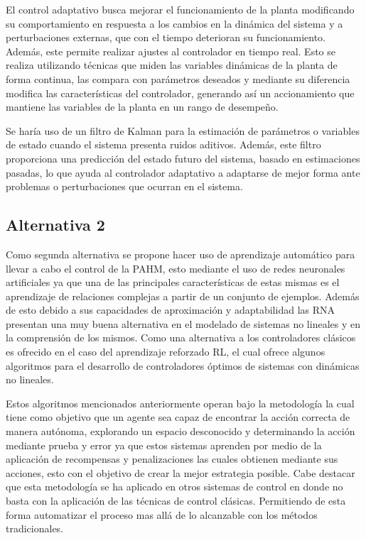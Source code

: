 \documentclass[12pt]{article}
\begin{document}
El control adaptativo busca mejorar el funcionamiento de la planta modificando su comportamiento en respuesta a los cambios en la dinámica del sistema y a perturbaciones externas, que con el tiempo deterioran su funcionamiento. Además, este permite realizar ajustes al controlador en tiempo real. Esto se realiza utilizando técnicas que miden las variables dinámicas de la planta de forma continua, las compara con parámetros deseados y mediante su diferencia modifica las características del controlador, generando así un accionamiento que mantiene las variables de la planta en un rango de desempeño\cite{15-tec}.

Se haría uso de un filtro de Kalman para la estimación de parámetros o variables de estado cuando el sistema presenta ruidos aditivos. Además, este filtro proporciona una predicción del estado futuro del sistema, basado en estimaciones pasadas, lo que ayuda al controlador adaptativo a adaptarse de mejor forma ante problemas o perturbaciones que ocurran en el sistema\cite{15-tec}.

\subsection{Alternativa 2}

Como segunda alternativa se propone hacer uso de aprendizaje automático para llevar a cabo el control de la PAHM, esto mediante el uso de redes neuronales artificiales ya que una de las principales características de estas mismas es el aprendizaje de relaciones complejas a partir de un conjunto de ejemplos. Además de esto debido a sus capacidades de aproximación y adaptabilidad las RNA presentan una muy buena alternativa en el modelado de sistemas no lineales y en la comprensión de los mismos. Como una alternativa a los controladores clásicos es ofrecido en el caso del aprendizaje reforzado RL, el cual ofrece algunos algoritmos para el desarrollo de controladores óptimos de sistemas con dinámicas no lineales\cite{15-tec}. 

Estos algoritmos mencionados anteriormente operan bajo la metodología la cual tiene como objetivo que un agente sea capaz de encontrar la acción correcta de manera autónoma, explorando un espacio desconocido y determinando la acción mediante prueba y error ya que estos sistemas aprenden por medio de la aplicación de recompensas y penalizaciones las cuales obtienen mediante sus acciones, esto con el objetivo de crear la mejor estrategia posible. Cabe destacar que esta metodología se ha aplicado en otros sistemas de control en donde no basta con la aplicación de las técnicas de control clásicas. Permitiendo de esta forma automatizar el proceso mas allá de lo alcanzable con los métodos tradicionales\cite{naizhang2022intel}. 
\end{document}
